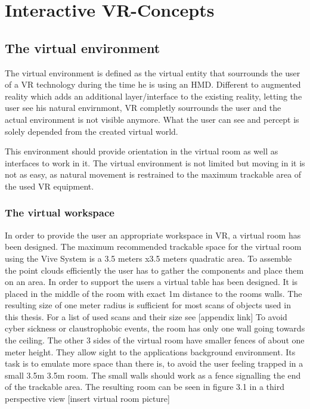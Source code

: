 \documentclass[hyperref,english,bachelorofscience,bibnum]{cgvpub}
\begin{document}
\chapter{Interactive VR-Concepts}

\section{The virtual environment}

The virtual environment is defined as the virtual entity that sourrounds the user of a VR technology during the time he is using an HMD. Different to augmented reality which adds an additional layer/interface to the existing reality, letting the user see his natural envirnmont, VR completly sourrounds the user and the actual environment is not visible anymore. What the user can see and percept is solely depended from the created virtual world\cite{Milgram1995}.

This environment should provide orientation in the virtual room as well as interfaces to work in it. The virtual environment is not limited but moving in it is not as easy, as natural movement is restrained to the maximum trackable area of the used VR equipment. 

\subsection{The virtual workspace}

In order to provide the user an appropriate workspace in VR, a virtual room has been designed. The maximum recommended trackable space for the virtual room using the Vive System is a 3.5 meters x3.5 meters quadratic area.
To assemble the point clouds efficiently the user has to gather the components and place them on an area. In order to support the users a virtual table has been designed. It is placed in the middle of the room with exact 1m distance to the rooms walls. The resulting size of one meter radius is sufficient for most scans of objects used in this thesis. For a list of used scans and their size see [appendix link]
To avoid cyber sickness or claustrophobic events, the room has only one wall going towards the ceiling. The other 3 sides of the virtual room have smaller fences of about one meter height. They allow sight to the applications background environment. Its task is to emulate more space than there is, to avoid the user feeling trapped in a small 3.5m 3.5m room. The small walls should work as a fence signalling the end of the trackable area. The resulting room can be seen in figure 3.1 in a third perspective view [insert virtual room picture]
 
\end{document}

